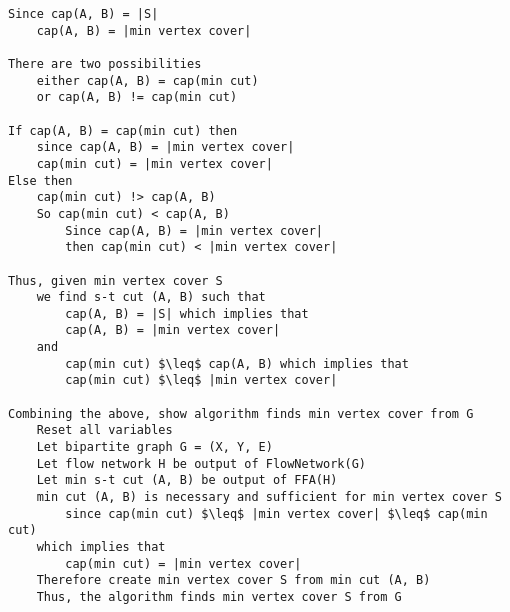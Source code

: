 \documentclass[11pt]{article}
\begin{document}
\begin{lstlisting}[basicstyle=\small, mathescape=true]
Since cap(A, B) = |S|
	cap(A, B) = |min vertex cover|
	
There are two possibilities
	either cap(A, B) = cap(min cut)
	or cap(A, B) != cap(min cut)

If cap(A, B) = cap(min cut) then
	since cap(A, B) = |min vertex cover|
	cap(min cut) = |min vertex cover|
Else then
	cap(min cut) !> cap(A, B)
	So cap(min cut) < cap(A, B)
		Since cap(A, B) = |min vertex cover|
		then cap(min cut) < |min vertex cover|

Thus, given min vertex cover S
	we find s-t cut (A, B) such that
		cap(A, B) = |S| which implies that
		cap(A, B) = |min vertex cover|
	and
		cap(min cut) $\leq$ cap(A, B) which implies that 
		cap(min cut) $\leq$ |min vertex cover|

Combining the above, show algorithm finds min vertex cover from G
	Reset all variables
	Let bipartite graph G = (X, Y, E)
	Let flow network H be output of FlowNetwork(G)
	Let min s-t cut (A, B) be output of FFA(H)
	min cut (A, B) is necessary and sufficient for min vertex cover S
		since cap(min cut) $\leq$ |min vertex cover| $\leq$ cap(min cut)
	which implies that
		cap(min cut) = |min vertex cover|
	Therefore create min vertex cover S from min cut (A, B)
	Thus, the algorithm finds min vertex cover S from G
\end{lstlisting}
\end{document}
